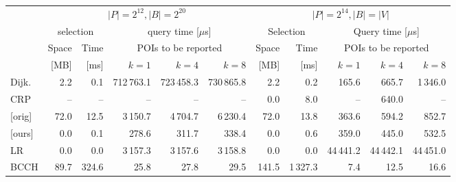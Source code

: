 \begin{tabular}{l@{\hskip2pt}rrrrrrrrrr}
\toprule
& \multicolumn{5}{c}{$|P| = 2^{12}, |B| = 2^{20}$} & \multicolumn{5}{c}{$|P| = 2^{14}, |B| = |V|$} \\ \cmidrule(l{2pt}r{2pt}){2-6}\cmidrule(l{2pt}r{2pt}){7-11}
& \multicolumn{2}{c}{selection} & \multicolumn{3}{c}{query time [$\mu$s]} & \multicolumn{2}{c}{Selection} & \multicolumn{3}{c}{Query time [$\mu$s]} \\ \cmidrule(l{3pt}r{3pt}){2-3}\cmidrule(l{3pt}r{3pt}){4-6}\cmidrule(l{3pt}r{3pt}){7-8}\cmidrule(l{3pt}r{3pt}){9-11}
& Space & Time & \multicolumn{3}{c}{POIs to be reported} & Space & Time & \multicolumn{3}{c}{POIs to be reported} \\
&  [MB] & [ms] & {$k = 1$} & {$k = 4$} & {$k = 8$} &  [MB] & {[ms]} & {$k = 1$} & {$k = 4$} & {$k = 8$} \\
\midrule
Dijk.       &   2.2 &      0.1 & 712\,763.1 & 723\,458.3 & 730\,865.8 &   2.2 &       0.2 &     165.6 &     665.7 &  1\,346.0 \\
CRP         &    -- &       -- &         -- &         -- &         -- &   0.0 &       8.0 &        -- &     640.0 &        -- \\
{[orig]}    &  72.0 &     12.5 &   3\,150.7 &   4\,704.7 &   6\,230.4 &  72.0 &      13.8 &     363.6 &     594.2 &     852.7 \\
{[ours]}    &   0.0 &      0.1 &      278.6 &      311.7 &      338.4 &   0.0 &       0.6 &     359.0 &     445.0 &     532.5 \\
LR          &   0.0 &      0.0 &   3\,157.3 &   3\,157.6 &   3\,158.8 &   0.0 &       0.0 & 44\,441.2 & 44\,442.1 & 44\,451.0 \\
BCCH        &  89.7 &    324.6 &       25.8 &       27.8 &       29.5 & 141.5 &  1\,327.3 &       7.4 &      12.5 &      16.6 \\
\bottomrule
\end{tabular}


